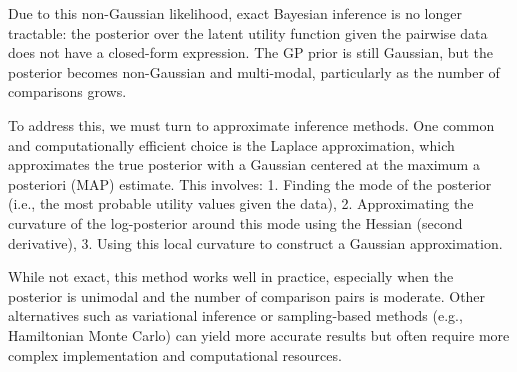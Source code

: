 \documentclass[
  letterpaper,
  numbers=noenddot,
  DIV=11]{scrreprt}
\theoremstyle{plain}
\theoremstyle{definition}
\theoremstyle{remark}
\begin{document}
Due to this non-Gaussian likelihood, exact Bayesian inference is no
longer tractable: the posterior over the latent utility function given
the pairwise data does not have a closed-form expression. The GP prior
is still Gaussian, but the posterior becomes non-Gaussian and
multi-modal, particularly as the number of comparisons grows.

To address this, we must turn to approximate inference methods. One
common and computationally efficient choice is the Laplace
approximation, which approximates the true posterior with a Gaussian
centered at the maximum a posteriori (MAP) estimate. This involves: 1.
Finding the mode of the posterior (i.e., the most probable utility
values given the data), 2. Approximating the curvature of the
log-posterior around this mode using the Hessian (second derivative), 3.
Using this local curvature to construct a Gaussian approximation.

While not exact, this method works well in practice, especially when the
posterior is unimodal and the number of comparison pairs is moderate.
Other alternatives such as variational inference or sampling-based
methods (e.g., Hamiltonian Monte Carlo) can yield more accurate results
but often require more complex implementation and computational
resources.
\end{document}
